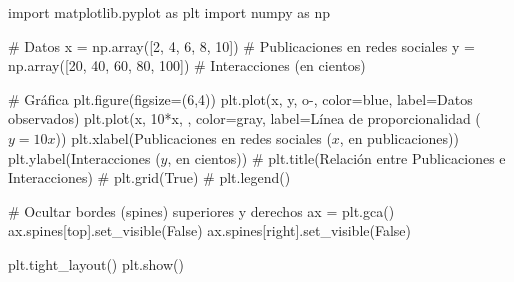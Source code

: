 \documentclass[
  stu,
  floatsintext,
  longtable,
  a4paper,
  nolmodern,
  notxfonts,
  notimes,
  12pt,
  colorlinks=true,linkcolor=blue,citecolor=blue,urlcolor=blue]{apa7}
\newenvironment{Shaded}{\begin{snugshade}}{\end{snugshade}}
\newcommand{\CommentTok}[1]{\textcolor[rgb]{0.37,0.37,0.37}{#1}}
\newcommand{\DecValTok}[1]{\textcolor[rgb]{0.68,0.00,0.00}{#1}}
\newcommand{\ImportTok}[1]{\textcolor[rgb]{0.00,0.46,0.62}{#1}}
\newcommand{\NormalTok}[1]{\textcolor[rgb]{0.00,0.23,0.31}{#1}}
\newcommand{\OperatorTok}[1]{\textcolor[rgb]{0.37,0.37,0.37}{#1}}
\newcommand{\StringTok}[1]{\textcolor[rgb]{0.13,0.47,0.30}{#1}}
\newcommand{\VariableTok}[1]{\textcolor[rgb]{0.07,0.07,0.07}{#1}}
\begin{document}
\begin{Shaded}
\begin{Highlighting}[]
\ImportTok{import}\NormalTok{ matplotlib.pyplot }\ImportTok{as}\NormalTok{ plt}
\ImportTok{import}\NormalTok{ numpy }\ImportTok{as}\NormalTok{ np}

\CommentTok{\# Datos}
\NormalTok{x }\OperatorTok{=}\NormalTok{ np.array([}\DecValTok{2}\NormalTok{, }\DecValTok{4}\NormalTok{, }\DecValTok{6}\NormalTok{, }\DecValTok{8}\NormalTok{, }\DecValTok{10}\NormalTok{])  }\CommentTok{\# Publicaciones en redes sociales}
\NormalTok{y }\OperatorTok{=}\NormalTok{ np.array([}\DecValTok{20}\NormalTok{, }\DecValTok{40}\NormalTok{, }\DecValTok{60}\NormalTok{, }\DecValTok{80}\NormalTok{, }\DecValTok{100}\NormalTok{])  }\CommentTok{\# Interacciones (en cientos)}

\CommentTok{\# Gráfica}
\NormalTok{plt.figure(figsize}\OperatorTok{=}\NormalTok{(}\DecValTok{6}\NormalTok{,}\DecValTok{4}\NormalTok{))}
\NormalTok{plt.plot(x, y, }\StringTok{\textquotesingle{}o{-}\textquotesingle{}}\NormalTok{, color}\OperatorTok{=}\StringTok{\textquotesingle{}blue\textquotesingle{}}\NormalTok{, label}\OperatorTok{=}\StringTok{\textquotesingle{}Datos observados\textquotesingle{}}\NormalTok{)}
\NormalTok{plt.plot(x, }\DecValTok{10}\OperatorTok{*}\NormalTok{x, }\StringTok{\textquotesingle{}{-}{-}\textquotesingle{}}\NormalTok{, color}\OperatorTok{=}\StringTok{\textquotesingle{}gray\textquotesingle{}}\NormalTok{, label}\OperatorTok{=}\StringTok{\textquotesingle{}Línea de proporcionalidad ($y = 10x$)\textquotesingle{}}\NormalTok{)}
\NormalTok{plt.xlabel(}\StringTok{\textquotesingle{}Publicaciones en redes sociales ($x$, en publicaciones)\textquotesingle{}}\NormalTok{)}
\NormalTok{plt.ylabel(}\StringTok{\textquotesingle{}Interacciones ($y$, en cientos)\textquotesingle{}}\NormalTok{)}
\CommentTok{\# plt.title(\textquotesingle{}Relación entre Publicaciones e Interacciones\textquotesingle{})}
\CommentTok{\# plt.grid(True)}
\CommentTok{\# plt.legend()}

\CommentTok{\# Ocultar bordes (spines) superiores y derechos}
\NormalTok{ax }\OperatorTok{=}\NormalTok{ plt.gca()}
\NormalTok{ax.spines[}\StringTok{\textquotesingle{}top\textquotesingle{}}\NormalTok{].set\_visible(}\VariableTok{False}\NormalTok{)}
\NormalTok{ax.spines[}\StringTok{\textquotesingle{}right\textquotesingle{}}\NormalTok{].set\_visible(}\VariableTok{False}\NormalTok{)}

\NormalTok{plt.tight\_layout()}
\NormalTok{plt.show()}
\end{Highlighting}
\end{Shaded}
\end{document}
